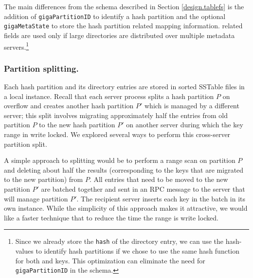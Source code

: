 The main differences from the \ldb{} schema described in Section
\ref{design.tablefs} is the addition of \texttt{gigaPartitionID} to identify a
\giga{} hash partition and the optional \texttt{gigaMetaState} to store the
hash partition related mapping information. \giga{} related fields are used
only if large directories are distributed over multiple metadata servers.\footnote{
Since we already store the \texttt{hash} of the directory entry, we can use the
hash-values to identify hash partitions if we chose to use the same hash
function for both \giga and \ldb keys. This optimization can eliminate the
need for \texttt{gigaPartitionID} in the schema.} 

\subsubsection*{Partition splitting.}

Each \giga{} hash partition and its directory entries are stored in sorted
SSTable files in a local \ldb{} instance. 
Recall that each \giga{} server process splits a hash partition $P$ on 
overflow and creates another hash partition $P'$ which is managed by a 
different server; this split involves migrating approximately half the entries 
from old partition $P$ to the new hash partition $P'$ on another server during
which the key range in write locked.
We explored several ways to perform this cross-server partition split.

A simple approach to splitting would be to perform a \ldb range scan on 
partition $P$ and deleting about half the results (corresponding to the keys
that are migrated to the new partition) from $P$. 
All entries that need to be moved to the new partition $P'$ are batched
together and sent in an RPC message to the server that will manage partition 
$P'$.
The recipient server inserts each key in the batch in its own \ldb{}
instance. While the simplicity of this approach makes it attractive, we would
like a faster technique that to reduce the time the range is write locked. 


